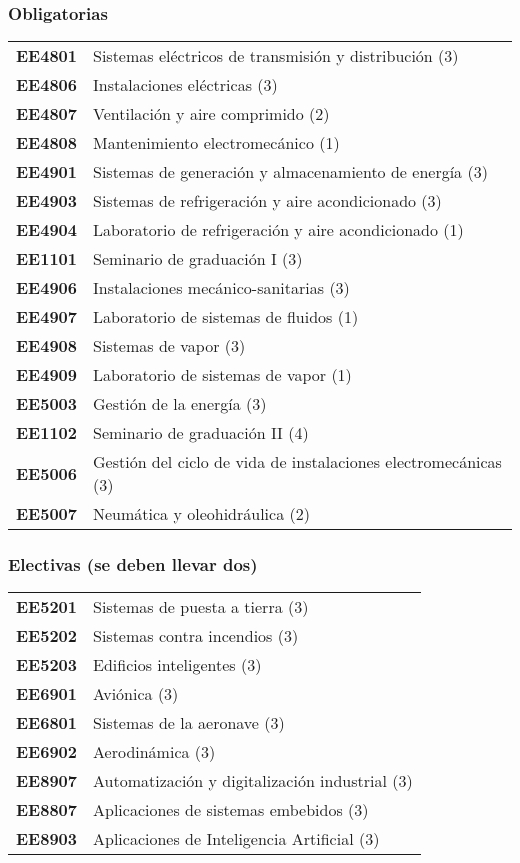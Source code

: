 \documentclass[letterpaper]{article}%
\begin{document}
\subsubsection*{Obligatorias}%
\label{ssubsec:Obligatorias}%
\vspace*{0.2cm}%
\begin{tabularx}{\textwidth}{p{1.5cm}p{10cm}}%
\textbf{EE4801}&Sistemas eléctricos de transmisión y distribución (3)\\%
\textbf{EE4806}&Instalaciones eléctricas (3)\\%
\textbf{EE4807}&Ventilación y aire comprimido (2)\\%
\textbf{EE4808}&Mantenimiento electromecánico (1)\\%
\textbf{EE4901}&Sistemas de generación y almacenamiento de energía (3)\\%
\textbf{EE4903}&Sistemas de refrigeración y aire acondicionado (3)\\%
\textbf{EE4904}&Laboratorio de refrigeración y aire acondicionado (1)\\%
\textbf{EE1101}&Seminario de graduación I (3)\\%
\textbf{EE4906}&Instalaciones mecánico{-}sanitarias (3)\\%
\textbf{EE4907}&Laboratorio de sistemas de fluidos (1)\\%
\textbf{EE4908}&Sistemas de vapor (3)\\%
\textbf{EE4909}&Laboratorio de sistemas de vapor (1)\\%
\textbf{EE5003}&Gestión de la energía (3)\\%
\textbf{EE1102}&Seminario de graduación II (4)\\%
\textbf{EE5006}&Gestión del ciclo de vida de instalaciones electromecánicas (3)\\%
\textbf{EE5007}&Neumática y oleohidráulica (2)\\%
\end{tabularx}

%
\subsubsection*{Electivas (se deben llevar dos)}%
\label{ssubsec:Electivas(sedebenllevardos)}%
\vspace*{0.2cm}%
\begin{tabularx}{\textwidth}{p{1.5cm}p{10cm}}%
\textbf{EE5201}&Sistemas de puesta a tierra (3)\\%
\textbf{EE5202}&Sistemas contra incendios (3)\\%
\textbf{EE5203}&Edificios inteligentes (3)\\%
\textbf{EE6901}&Aviónica (3)\\%
\textbf{EE6801}&Sistemas de la aeronave (3)\\%
\textbf{EE6902}&Aerodinámica (3)\\%
\textbf{EE8907}&Automatización y digitalización industrial (3)\\%
\textbf{EE8807}&Aplicaciones de sistemas embebidos (3)\\%
\textbf{EE8903}&Aplicaciones de Inteligencia Artificial (3)\\%
\end{tabularx}
\end{document}

